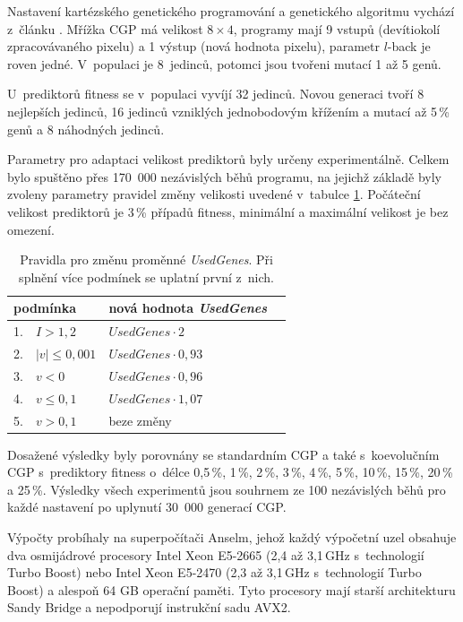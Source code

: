 \documentclass[czech]{ExcelAtFIT} %
\begin{document}
Nastavení kartézského genetického programování a genetického algoritmu vychází z~článku \cite{SikuPPSN}. Mřížka CGP má velikost $8 \times 4$, programy mají 9 vstupů (devíti\-okolí zpracovávaného pixelu) a 1 výstup (nová hodnota pixelu), parametr $l$-back je roven jedné. V~populaci je 8~jedinců, potomci jsou tvořeni mutací 1 až 5 genů.

U~prediktorů fitness se v~populaci vyvíjí 32 jedinců. Novou generaci tvoří 8 nejlepších jedinců, 16 jedinců vzniklých jednobodovým křížením a mutací až 5\,\% genů a 8 náhodných jedinců.

Parametry pro adaptaci velikost prediktorů byly určeny experimentálně. Celkem bylo spuštěno přes 170~000 nezávislých běhů programu, na jejichž základě byly zvoleny parametry pravidel změny velikosti uvedené v~tabulce \ref{table:rules}. Počáteční velikost prediktorů je 3\,\% případů fitness, minimální a maximální velikost je bez omezení.

\begin{table}[hbt]
    \vskip6pt
    \caption{Pravidla pro změnu proměnné \textit{UsedGenes}. Při splnění více podmínek se uplatní první z~nich.}
    \label{table:rules}
    \centering
    \renewcommand{\arraystretch}{1.1}
    \begin{tabular}{llll}
        \toprule
        \multicolumn{2}{l}{podmínka}      &  nová hodnota \textit{UsedGenes}  \\
        \midrule
        1. &  $I > 1,2$                   &  $\mathit{UsedGenes} \cdot 2    $     \\
        2. &  $\left|v\right| \leq 0,001$ &  $\mathit{UsedGenes} \cdot 0,93 $  \\
        3. &  $v < 0$                     &  $\mathit{UsedGenes} \cdot 0,96 $  \\
        4. &  $v \leq 0,1$                &  $\mathit{UsedGenes} \cdot 1,07 $  \\
        5. &  $v > 0,1$                   &  beze změny             \\
        \bottomrule
    \end{tabular}
\end{table}

Dosažené výsledky byly porovnány se standardním CGP a také s~koevolučním CGP s~prediktory fitness o~délce 0,5\,\%, 1\,\%, 2\,\%, 3\,\%, 4\,\%, 5\,\%, 10\,\%, 15\,\%, 20\,\% a 25\,\%. Výsledky všech experimentů jsou souhrnem ze 100 nezávislých běhů pro každé nastavení po uplynutí 30~000 generací CGP.

Výpočty probíhaly na superpočítači Anselm, \mbox{jehož} každý výpočetní uzel obsahuje dva osmijádrové procesory Intel Xeon E5-2665 (2,4 až 3,1\,GHz s~technologií Turbo Boost) nebo Intel Xeon E5-2470 (2,3 až 3,1\,GHz s~technologií Turbo Boost) a alespoň 64 GB operační paměti. Tyto procesory mají starší architekturu Sandy Bridge a nepodporují instrukční sadu AVX2.
\end{document}
